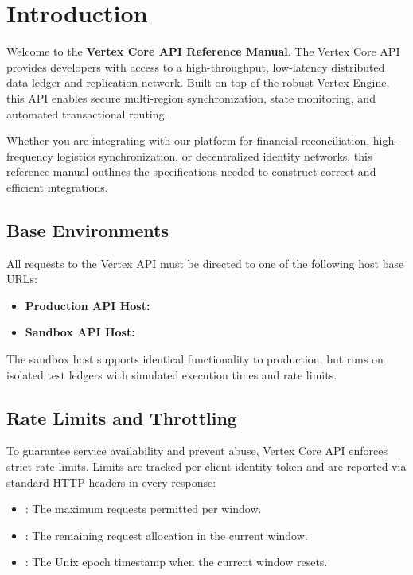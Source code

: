 \section{Introduction}
Welcome to the \textbf{Vertex Core API Reference Manual}. The Vertex Core API provides developers with access to a high-throughput, low-latency distributed data ledger and replication network. Built on top of the robust Vertex Engine, this API enables secure multi-region synchronization, state monitoring, and automated transactional routing.

Whether you are integrating with our platform for financial reconciliation, high-frequency logistics synchronization, or decentralized identity networks, this reference manual outlines the specifications needed to construct correct and efficient integrations.

\subsection{Base Environments}
All requests to the Vertex API must be directed to one of the following host base URLs:
\begin{itemize}
  \item \textbf{Production API Host:} 
  \item \textbf{Sandbox API Host:} 
\end{itemize}
The sandbox host supports identical functionality to production, but runs on isolated test ledgers with simulated execution times and rate limits.

\subsection{Rate Limits and Throttling}
To guarantee service availability and prevent abuse, Vertex Core API enforces strict rate limits. Limits are tracked per client identity token and are reported via standard HTTP headers in every response:
\begin{itemize}
  \item {}: The maximum requests permitted per window.
  \item {}: The remaining request allocation in the current window.
  \item {}: The Unix epoch timestamp when the current window resets.
\end{itemize}

